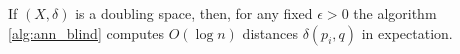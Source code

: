\documentclass[a4paper,USenglish]{socg-lipics-v2018}
\newcommand{\eps}{\epsilon}
\newcommand{\dist}{\delta}
\begin{document}



\begin{theorem}
    If $(X, \dist)$ is a doubling space, then, for any fixed $\eps > 0$ the
    algorithm \ref{alg:ann_blind} computes $O(\log n)$ distances $\dist(p_i, q)$ in expectation.
\end{theorem}
\end{document}
